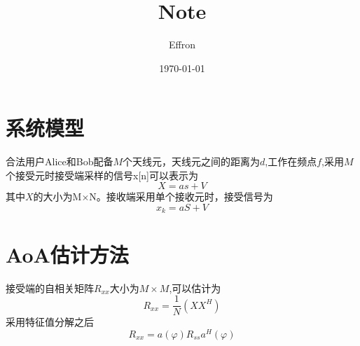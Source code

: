 \documentclass[geye,green,normal,cn]{elegantnote}
\title{Note}
\author{Effron}
\institute{SEU}
\date{\today}
\begin{document}
\maketitle
\section{系统模型}
合法用户Alice和Bob配备$M$个天线元，天线元之间的距离为$d$,工作在频点$f$,采用$M$个接受元时接受端采样的信号x[n]可以表示为
\begin{equation}
    X = as + V
\end{equation}
其中$X$的大小为M$\times$N。接收端采用单个接收元时，接受信号为
\begin{equation}
    x_{k} = aS + V
\end{equation}
\section{AoA估计方法}
接受端的自相关矩阵$R_{xx}$大小为$M\times M$,可以估计为
\begin{equation}
    R_{xx} = \frac{1}{N}(XX^H)
\end{equation}
采用特征值分解之后
 \begin{equation}
    R_{xx} = a(\varphi) R_{ss}a^H(\varphi)
 \end{equation}
\end{document}
